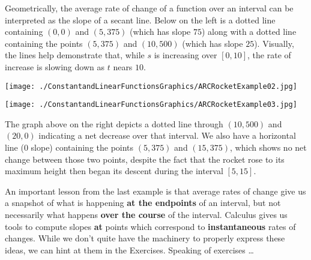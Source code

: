 \documentclass{ximera}
\begin{document}
\begin{example}
\begin{explanation}
\begin{enumerate}
Geometrically, the average rate of change of a function over an interval can be interpreted as the slope of a secant line. Below on the left is a dotted line containing $(0, 0)$ and $(5, 375)$ (which has slope $75$) along with a dotted line containing the points $(5, 375)$ and $(10, 500)$ (which has slope $25$).  Visually, the lines help demonstrate that, while $s$ is increasing over $[0, 10]$, the rate of increase is slowing down as $t$ nears $10$.  






\texttt{[image: ./ConstantandLinearFunctionsGraphics/ARCRocketExample02.jpg]}

\texttt{[image: ./ConstantandLinearFunctionsGraphics/ARCRocketExample03.jpg]}




The graph above on the right depicts a dotted line through $(10, 500)$ and $(20,0)$ indicating a net decrease over that interval.  We also have a horizontal line ($0$ slope) containing the points $(5, 375)$ and $(15, 375)$, which shows no net change between those two points, despite the fact that the rocket rose to its maximum height then began its descent during the interval $[5, 15]$.   




\end{enumerate}

\end{explanation}

\end{example}

An important lesson from the last example is that average rates of change give us a snapshot of what is happening \textbf{at the endpoints} of an interval, but not necessarily what happens \textbf{over the course} of the interval.  Calculus gives us tools to compute slopes \textbf{at} points which correspond to  \textbf{instantaneous} rates of changes.  While we don't quite have the machinery to properly express these ideas, we can hint at them in the Exercises. Speaking of exercises \ldots 
\end{document}
